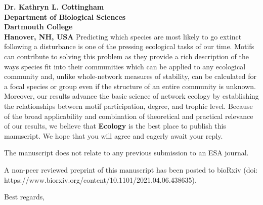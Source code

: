 \documentclass[12pt]{letter}
\begin{document}
\begin{letter}{\bf Dr. Kathryn L. Cottingham \\
Department of Biological Sciences \\
Dartmouth College \\
Hanover, NH, USA}
 	Predicting which species are most likely to go extinct following a disturbance is one of the pressing ecological tasks of our time. 
 	Motifs can contribute to solving this problem as they provide a rich description of the ways species fit into their communities which can be applied to any ecological community and, unlike whole-network measures of stability, can be calculated for a focal species or group even if the structure of an entire community is unknown.
 	Moreover, our results advance the basic science of network ecology by establishing the relationships between motif participation, degree, and trophic level. 
 	Because of the broad applicability and combination of theoretical and practical relevance of our results, we believe that \textbf{Ecology} is the best place to publish this manuscript. 
 	We hope that you will agree and eagerly await your reply.


	The manuscript does not relate to any previous submission to an ESA journal. 


	A non-peer reviewed preprint of this manuscript has been posted to bioRxiv (doi: https://www.biorxiv.org/content/10.1101/2021.04.06.438635).

\closing{Best regards,}



\end{letter}
\end{document}
